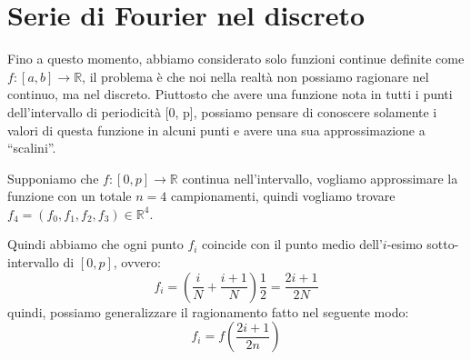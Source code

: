 \section{Serie di Fourier nel discreto}
Fino a questo momento, abbiamo considerato solo funzioni continue definite come
$f:[a,b]\to \mathbb{R}$, il problema è che noi nella realtà non possiamo ragionare
nel continuo, ma nel discreto. Piuttosto che avere una funzione nota in tutti i
punti dell'intervallo di periodicità [0, p], possiamo pensare di conoscere solamente
i valori di questa funzione in alcuni punti e avere una sua approssimazione a “scalini”.

Supponiamo che $f:[0,p] \to \mathbb{R}$ continua nell'intervallo, vogliamo approssimare
la funzione con un totale $n = 4$ campionamenti, quindi vogliamo trovare $f_4 = (f_0, f_1,f_2,f_3)\in \mathbb{R}^4$.

Quindi abbiamo che ogni punto $f_i$ coincide con il punto medio dell'$i$-esimo
sotto-intervallo di $[0,p]$, ovvero:
\begin{equation*}
    f_i= \left(\frac{i}{N} + \frac{i+1}{N}\right) \frac{1}{2} = \frac{2i+1}{2N}
\end{equation*}
quindi, possiamo generalizzare il ragionamento fatto nel seguente modo:
\begin{equation*}
    f_i = f(\frac{2i+1}{2n})
\end{equation*}

